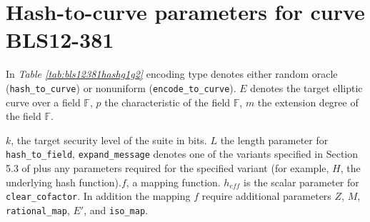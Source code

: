 \section{Hash-to-curve parameters for curve BLS12-381}
\label{sec:apx.hashtocurve}

In \textit{Table \ref{tab:bls12381hashg1g2}} encoding type denotes either random oracle (\lstinline|hash_to_curve|) or nonuniform (\lstinline|encode_to_curve|).
$E$ denotes the target elliptic curve over a field $\mathbb{F}$, $p$ the characteristic of the field $\mathbb{F}$, $m$ the extension degree of the field $\mathbb{F}$.

$k$, the target security level of the suite in bits. $L$ the length parameter for \lstinline|hash_to_field|, \lstinline|expand_message| denotes one of the variants specified in Section 5.3 of \cite{ecc.hashing} plus any parameters required for the specified variant (for example, $H$, the underlying hash function).$f$, a mapping function. $h_{eff}$ is the scalar parameter for \lstinline|clear_cofactor|. In addition the mapping $f$ require additional parameters $Z$, $M$, \lstinline|rational_map|, $E'$, and \lstinline|iso_map|. \cite{ecc.hashing}


